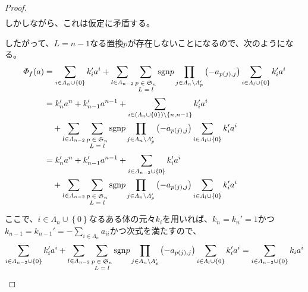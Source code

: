 \documentclass[dvipdfmx]{jsarticle}
\begin{document}
\begin{proof}
\begin{align*}
\end{align*}
しかしながら、これは仮定に矛盾する。\par
したがって、$L = n - 1$なる置換$p$が存在しないことになるので、次のようになる。
\begin{align*}
\varPhi_{f}(a) &= \sum_{i \in \varLambda_{n} \cup \left\{ 0 \right\}} {k_{i}'a^{i}} + \sum_{l \in \varLambda_{n - 2}} {\sum_{\scriptsize \begin{matrix} p \in \mathfrak{S}_{n} \\ L = l \\\end{matrix}} {{\mathrm{sgn} }p\prod_{j \in \varLambda_{n} \setminus \varLambda_{p}' } \left( - a_{p(j),j} \right)\sum_{i \in \varLambda_{l} \cup \left\{ 0 \right\}} {k_{i}'a^{i}}}}\\
&= k_{n}'a^{n} + k_{n - 1}'a^{n - 1} + \sum_{i \in \left( \varLambda_{n} \cup \left\{ 0 \right\} \right) \setminus \left\{ n,n - 1 \right\}} {k_{i}'a^{i}} \\
&\quad + \sum_{l \in \varLambda_{n - 2}} {\sum_{\scriptsize \begin{matrix} p \in \mathfrak{S}_{n} \\ L = l \\\end{matrix}} {{\mathrm{sgn} }p\prod_{j \in \varLambda_{n} \setminus \varLambda_{p}' } \left( - a_{p(j),j} \right)\sum_{i \in \varLambda_{l} \cup \left\{ 0 \right\}} {k_{i}'a^{i}}}}\\
&= k_{n}'a^{n} + k_{n - 1}'a^{n - 1} + \sum_{i \in \varLambda_{n - 2} \cup \left\{ 0 \right\}} {k_{i}'a^{i}} \\
&\quad + \sum_{l \in \varLambda_{n - 2}} {\sum_{\scriptsize \begin{matrix} p \in \mathfrak{S}_{n}\\ L = l \end{matrix}} {{\mathrm{sgn} }p\prod_{j \in \varLambda_{n} \setminus \varLambda_{p}' } \left( - a_{p(j),j} \right)\sum_{i \in \varLambda_{l} \cup \left\{ 0 \right\}} {k_{i}'a^{i}}}}
\end{align*}
ここで、$i \in \varLambda_{n} \cup \left\{ 0 \right\}$なるある体の元々$k_{i}$を用いれば、$k_{n} = k_{n}' = 1$かつ$k_{n - 1} = k_{n - 1}' = - \sum_{i \in \varLambda_{n}} a_{ii}$かつ次式を満たすので、
\begin{align*}
\sum_{i \in \varLambda_{n - 2} \cup \left\{ 0 \right\}} {k_{i}'a^{i}} + \sum_{l \in \varLambda_{n - 2}} {\sum_{\scriptsize \begin{matrix} p \in \mathfrak{S}_{n}\\ L = l \\\end{matrix}} {{\mathrm{sgn} }p\prod_{j \in \varLambda_{n} \setminus \varLambda_{p}' } \left( - a_{p(j),j} \right)\sum_{i \in \varLambda_{l} \cup \left\{ 0 \right\}} {k_{i}'a^{i}}}} = \sum_{i \in \varLambda_{n - 2} \cup \left\{ 0 \right\}} {k_{i}a^{i}}

\end{align*}
\end{proof}
\end{document}
